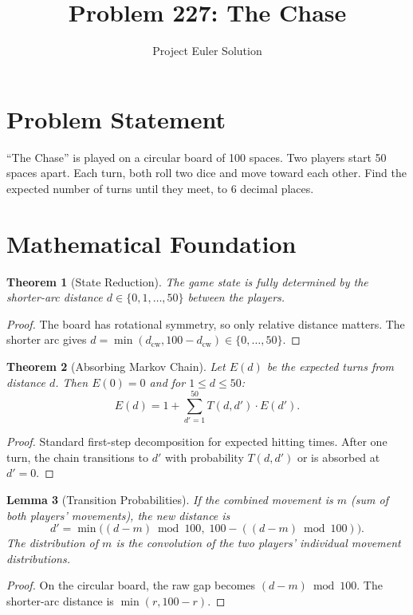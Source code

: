\documentclass[12pt]{article}
\title{Problem 227: The Chase}
\author{Project Euler Solution}
\date{}
\newtheorem{theorem}{Theorem}
\newtheorem{lemma}[theorem]{Lemma}
\begin{document}
\maketitle

\section{Problem Statement}
``The Chase'' is played on a circular board of 100 spaces. Two players start 50 spaces apart. Each turn, both roll two dice and move toward each other. Find the expected number of turns until they meet, to 6 decimal places.

\section{Mathematical Foundation}

\begin{theorem}[State Reduction]
The game state is fully determined by the shorter-arc distance $d \in \{0, 1, \ldots, 50\}$ between the players.
\end{theorem}
\begin{proof}
The board has rotational symmetry, so only relative distance matters. The shorter arc gives $d = \min(d_{\text{cw}}, 100 - d_{\text{cw}}) \in \{0, \ldots, 50\}$.
\end{proof}

\begin{theorem}[Absorbing Markov Chain]
Let $E(d)$ be the expected turns from distance $d$. Then $E(0) = 0$ and for $1 \leq d \leq 50$:
\[
E(d) = 1 + \sum_{d'=1}^{50} T(d, d') \cdot E(d').
\]
\end{theorem}
\begin{proof}
Standard first-step decomposition for expected hitting times. After one turn, the chain transitions to $d'$ with probability $T(d, d')$ or is absorbed at $d' = 0$.
\end{proof}

\begin{lemma}[Transition Probabilities]
If the combined movement is $m$ (sum of both players' movements), the new distance is
\[
d' = \min\bigl((d-m) \bmod 100, \; 100 - ((d-m) \bmod 100)\bigr).
\]
The distribution of $m$ is the convolution of the two players' individual movement distributions.
\end{lemma}
\begin{proof}
On the circular board, the raw gap becomes $(d-m) \bmod 100$. The shorter-arc distance is $\min(r, 100-r)$.
\end{proof}
\end{document}
